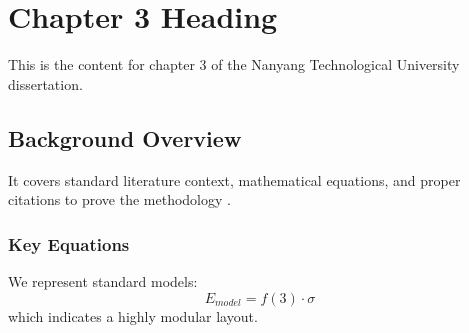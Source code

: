 \chapter{Chapter 3 Heading}
\label{ch:chapter3}
This is the content for chapter 3 of the Nanyang Technological University dissertation.

\section{Background Overview}
It covers standard literature context, mathematical equations, and proper citations to prove the methodology \cite{texbook}.

\subsection{Key Equations}
We represent standard models:
\begin{equation}
    E_{model} = f(3) \cdot \sigma
\end{equation}
which indicates a highly modular layout.

